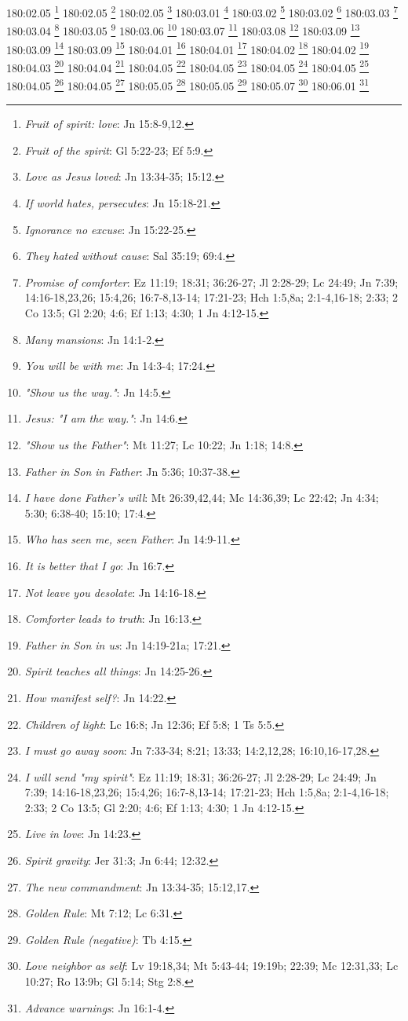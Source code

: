 180:02.05 \footnote{\textit{Fruit of spirit: love}: Jn 15:8-9,12.}
180:02.05 \footnote{\textit{Fruit of the spirit}: Gl 5:22-23; Ef 5:9.}
180:02.05 \footnote{\textit{Love as Jesus loved}: Jn 13:34-35; 15:12.}
180:03.01 \footnote{\textit{If world hates, persecutes}: Jn 15:18-21.}
180:03.02 \footnote{\textit{Ignorance no excuse}: Jn 15:22-25.}
180:03.02 \footnote{\textit{They hated without cause}: Sal 35:19; 69:4.}
180:03.03 \footnote{\textit{Promise of comforter}: Ez 11:19; 18:31; 36:26-27; Jl 2:28-29; Lc 24:49; Jn 7:39; 14:16-18,23,26; 15:4,26; 16:7-8,13-14; 17:21-23; Hch 1:5,8a; 2:1-4,16-18; 2:33; 2 Co 13:5; Gl 2:20; 4:6; Ef 1:13; 4:30; 1 Jn 4:12-15.}
180:03.04 \footnote{\textit{Many mansions}: Jn 14:1-2.}
180:03.05 \footnote{\textit{You will be with me}: Jn 14:3-4; 17:24.}
180:03.06 \footnote{\textit{"Show us the way."}: Jn 14:5.}
180:03.07 \footnote{\textit{Jesus: "I am the way."}: Jn 14:6.}
180:03.08 \footnote{\textit{"Show us the Father"}: Mt 11:27; Lc 10:22; Jn 1:18; 14:8.}
180:03.09 \footnote{\textit{Father in Son in Father}: Jn 5:36; 10:37-38.}
180:03.09 \footnote{\textit{I have done Father's will}: Mt 26:39,42,44; Mc 14:36,39; Lc 22:42; Jn 4:34; 5:30; 6:38-40; 15:10; 17:4.}
180:03.09 \footnote{\textit{Who has seen me, seen Father}: Jn 14:9-11.}
180:04.01 \footnote{\textit{It is better that I go}: Jn 16:7.}
180:04.01 \footnote{\textit{Not leave you desolate}: Jn 14:16-18.}
180:04.02 \footnote{\textit{Comforter leads to truth}: Jn 16:13.}
180:04.02 \footnote{\textit{Father in Son in us}: Jn 14:19-21a; 17:21.}
180:04.03 \footnote{\textit{Spirit teaches all things}: Jn 14:25-26.}
180:04.04 \footnote{\textit{How manifest self?}: Jn 14:22.}
180:04.05 \footnote{\textit{Children of light}: Lc 16:8; Jn 12:36; Ef 5:8; 1 Ts 5:5.}
180:04.05 \footnote{\textit{I must go away soon}: Jn 7:33-34; 8:21; 13:33; 14:2,12,28; 16:10,16-17,28.}
180:04.05 \footnote{\textit{I will send "my spirit"}: Ez 11:19; 18:31; 36:26-27; Jl 2:28-29; Lc 24:49; Jn 7:39; 14:16-18,23,26; 15:4,26; 16:7-8,13-14; 17:21-23; Hch 1:5,8a; 2:1-4,16-18; 2:33; 2 Co 13:5; Gl 2:20; 4:6; Ef 1:13; 4:30; 1 Jn 4:12-15.}
180:04.05 \footnote{\textit{Live in love}: Jn 14:23.}
180:04.05 \footnote{\textit{Spirit gravity}: Jer 31:3; Jn 6:44; 12:32.}
180:04.05 \footnote{\textit{The new commandment}: Jn 13:34-35; 15:12,17.}
180:05.05 \footnote{\textit{Golden Rule}: Mt 7:12; Lc 6:31.}
180:05.05 \footnote{\textit{Golden Rule (negative)}: Tb 4:15.}
180:05.07 \footnote{\textit{Love neighbor as self}: Lv 19:18,34; Mt 5:43-44; 19:19b; 22:39; Mc 12:31,33; Lc 10:27; Ro 13:9b; Gl 5:14; Stg 2:8.}
180:06.01 \footnote{\textit{Advance warnings}: Jn 16:1-4.}

